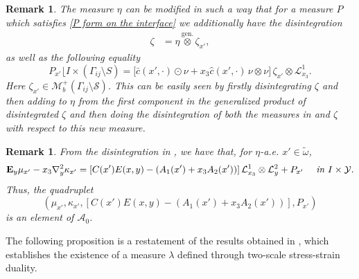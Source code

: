 \documentclass[reqno,10pt]{amsart}
\numberwithin{equation}{section}
\newtheorem{remark}[theorem]{Remark}
\theoremstyle{remark}
\newcommand{\calA}{\mathcal{A}}
\newcommand{\calL}{\mathcal{L}}
\newcommand{\calM}{\mathcal{M}}
\newcommand{\calS}{\mathcal{S}}
\newcommand{\calY}{\mathcal{Y}}
\newcommand{\mres}[1]{\lfloor{#1}}
\newcommand{\genprod}{\stackrel{\text{gen.}}{\otimes}}
\newcommand{\ext}[1]{\widetilde{#1}}
\newcommand{\E}{{\bf E}}
\newcommand{\D}{\nabla}
\begin{document}
\begin{remark} \label{P_x' form on the interface}
The measure $\eta$ can be modified in such a way that for a measure $P$ which satisfies \eqref{P form on the interface} we additionally have the disintegration
\begin{align}
	\label{disintegration result 5 - regime zero} \zeta & = \eta \genprod \zeta_{x'},
\end{align}
as well as the following equality
\begin{equation}
	P_{x'}\mres{I \times (\Gamma_{ij} \setminus S)} = \big[ \bar{c}(x',\cdot) \odot \nu + x_3 \hat{c}(x',\cdot) \, \nu \otimes \nu \big]\,\zeta_{x'} \otimes \calL_{x_3}^1.
\end{equation}
Here $\zeta_{x'} \in \calM_b^{+} (\Gamma_{ij} \setminus \calS) $. This can be easily seen by firstly disintegrating $\zeta$ and then adding to $\eta$ from  the first component in the generalized product of disintegrated $\zeta$ and then doing the disintegration of both the measures in  and $\zeta$ with respect to this new measure. 
\end{remark}

\begin{remark} \label{admissible configurations and disintegration - regime zero}
From the disintegration in , we have that, for $\eta$-a.e. $x' \in \ext{\omega}$, 
\begin{equation*}
	{\E}_{y}\mu_{x'} - x_3 {\D}^2_{y}\kappa_{x'} = \left[ C(x') E(x,y) - \left( A_1(x') + x_3 A_2(x') \right) \right] \calL^{1}_{x_3} \otimes \calL^{2}_{y} + P_{x'} \quad \textit{ in } I \times \calY.
\end{equation*}
Thus, the quadruplet
\begin{equation*}
	\left( \mu_{x'}, \kappa_{x'}, \left[ C(x') E(x,y) - \left( A_1(x') + x_3 A_2(x') \right) \right], P_{x'} \right)
\end{equation*}
is an element of $\calA_{0}$.
\end{remark}

The following proposition is a restatement of the results obtained in \cite[Proposition 5.30.]{Buzancic.Davoli.Velcic.2024.2nd}, which establishes the existence of a measure $\lambda$ defined through two-scale stress-strain duality. 
\end{document}
